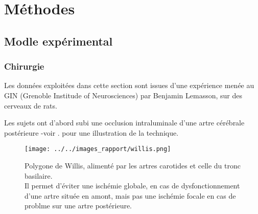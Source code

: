 \section{M\'ethodes}


\begin{comment}
\makeatletter
\renewcommand{\thefigure}{\ifnum \c@section>\z@ \thesection.\fi
 \@arabic\c@figure}
\@addtoreset{figure}{section}
\makeatother
Remarque : pour renuméroter les sous-figures de la même manière
           (avec le package 'subfigure'), il suffit de rajouter
	   la ligne \let\p@subfigure\thefigure dans le préambule.
\end{comment}

\subsection{Modle exp\'erimental}

\subsubsection{Chirurgie}

Les donn\'ees exploit\'ees dans cette section sont issues d'une exp\'erience men\'ee au GIN (Grenoble Institude of Neurosciences) par Benjamin Lemasson, %
sur des cerveaux de rats.

\par
Les sujets ont d'abord subi une occlusion intraluminale d'une artre c\'er\'ebrale post\'erieure -voir \cite{Durukan_PBB_07}. pour une illustration de la technique.


\begin{figure}[H]
\texttt{[image: ../../images\_rapport/willis.png]}
\caption{Polygone de Willis, aliment\'e par les artres carotides et celle du tronc basilaire.
\\
Il permet d'\'eviter une isch\'emie globale, en cas de dysfonctionnement d'une artre situ\'ee en amont, %
mais pas une isch\'emie focale en cas de problme sur une artre post\'erieure.
}
\label{willis}
\end{figure}

